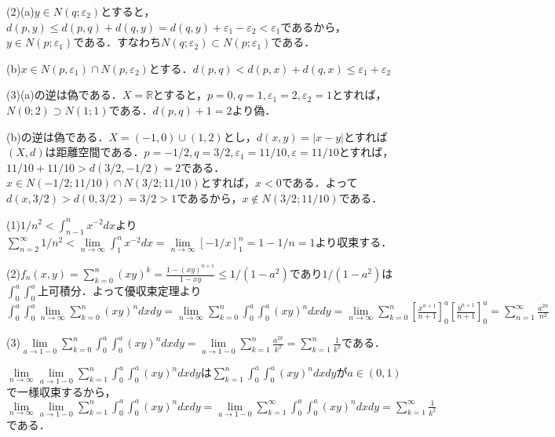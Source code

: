 \documentclass[
		book,
		head_space=20mm,
		foot_space=20mm,
		gutter=10mm,
		line_length=190mm
]{jlreq}
\begin{document}
(2)(a)$y\in N(q;\varepsilon_2)$とすると，$d(p,y)\le d(p,q)+d(q,y)=d(q,y)+\varepsilon_1-\varepsilon_2<\varepsilon_1$であるから，$y\in N(p;\varepsilon_1)$である．すなわち$N(q;\varepsilon_2)\subset N(p;\varepsilon_1)$である．

(b)$x\in N(p,\varepsilon_1)\cap N(p,\varepsilon_2)$とする．$d(p,q)<d(p,x)+d(q,x) \le \varepsilon_1+\varepsilon_2$

(3)(a)の逆は偽である．$X=\mathbb{R}$とすると，$p=0,q=1,\varepsilon_1=2,\varepsilon_2=1$とすれば，$N(0;2) \supset N(1;1)$である．$d(p,q)+1=2$より偽．

(b)の逆は偽である．$X=(-1,0)\cup (1,2)$とし，$d(x,y)=|x-y|$とすれば$(X,d)$は距離空間である．$p=-1/2,q=3/2,\varepsilon_1=11/10,\varepsilon=11/10$とすれば，$11/10+11/10>d(3/2,-1/2)=2$である．$x \in N(-1/2;11/10)\cap N(3/2;11/10)$とすれば，$x<0$である．よって$d(x,3/2)>d(0,3/2)=3/2>1$であるから，$x \notin N(3/2;11/10)$である．

(1)$1/n^2 < \int_{n-1}^n x^{-2} dx$より$\sum\limits_{n=2}^{\infty} 1/n^2 < \lim\limits_{n \to \infty}\int_1^{n} x^{-2} dx=\lim\limits_{n\to \infty} [-1/x]_1^n=1-1/n =1$より収束する．

(2)$f_n(x,y)=\sum\limits_{k=0}^n (xy)^k = \frac{1-(xy)^{n+1}}{1-xy}\le 1/(1-a^2)$であり$1/(1-a^2)$は$\int_0^a\int_0^a$上可積分．よって優収束定理より$\int_0^a \int_0^a \lim\limits_{n\to \infty}\sum\limits_{k=0}^{n} (xy)^n dxdy=\lim\limits_{n\to \infty} \sum\limits_{k=0}^{n} \int_0^a\int_0^a (xy)^n dxdy = \lim\limits_{n\to \infty} \sum\limits_{k=0}^{n} [\frac{x^{n+1}}{n+1}]_0^a[\frac{y^{n+1}}{n+1}]_0^a=\sum\limits_{n=1}^{\infty} \frac{a^{2n}}{n^2}$

(3)$\lim\limits_{a \to 1-0}\sum\limits_{k=0}^{n} \int_0^a\int_0^a (xy)^n dxdy =\lim\limits_{a \to 1-0}\sum\limits_{k=1}^{n} \frac{a^{2k}}{k^2}=\sum\limits_{k=1}^{n} \frac{1}{k^2}$である．

$\lim\limits_{n\to \infty}\lim\limits_{a \to 1-0}\sum\limits_{k=1}^{n} \int_0^a\int_0^a (xy)^n dxdy$は$\sum\limits_{k=1}^{n} \int_0^a\int_0^a (xy)^n dxdy$が$a\in (0,1)$で一様収束するから，
$\lim\limits_{n\to \infty}\lim\limits_{a \to 1-0}\sum\limits_{k=1}^{n} \int_0^a\int_0^a (xy)^n dxdy=\lim\limits_{a\to 1-0}\sum\limits_{k=1}^{\infty} \int_0^a\int_0^a (xy)^n dxdy=\sum\limits_{k=1}^{\infty} \frac{1}{k^2}$である．
\end{document}
